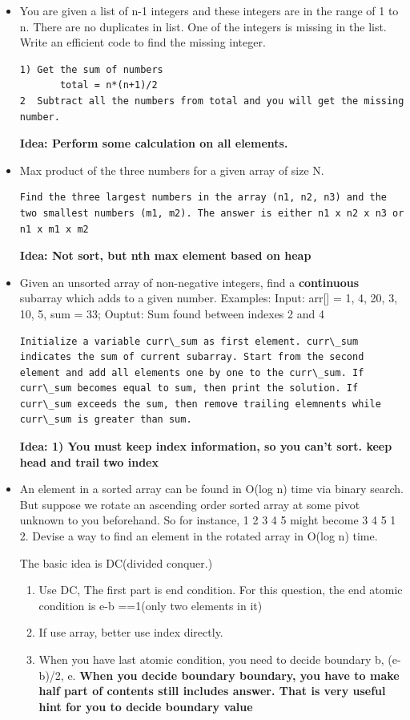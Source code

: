 \documentclass[a4paper,12pt,twoside]{book}
\begin{document}
\begin{itemize}
\item You are given a list of n-1 integers and these integers are in the range of 1 to n. There are no duplicates in list. One of the integers is missing in the list. Write an efficient code to find the missing integer.
\begin{lstlisting}[breaklines]
1) Get the sum of numbers 
       total = n*(n+1)/2
2  Subtract all the numbers from total and you will get the missing number.
\end{lstlisting}
\textbf{Idea: Perform some calculation on all elements. }

\item Max product of the three numbers for a given array of size N. 
\begin{lstlisting}[breaklines]
Find the three largest numbers in the array (n1, n2, n3) and the two smallest numbers (m1, m2). The answer is either n1 x n2 x n3 or n1 x m1 x m2
\end{lstlisting}
\textbf{Idea: Not sort, but nth max element based on heap}

\item Given an unsorted array of non-negative integers, find a \textbf{continuous} subarray which adds to a given number.  Examples: Input: arr[] = {1, 4, 20, 3, 10, 5}, sum = 33; Ouptut: Sum found between indexes 2 and 4
\begin{lstlisting}[breaklines]
Initialize a variable curr\_sum as first element. curr\_sum indicates the sum of current subarray. Start from the second element and add all elements one by one to the curr\_sum. If curr\_sum becomes equal to sum, then print the solution. If curr\_sum exceeds the sum, then remove trailing elemnents while curr\_sum is greater than sum.
\end{lstlisting}
\textbf{Idea: 1) You must keep index information, so you can't sort.  keep head and trail two index}

\item An element in a sorted array can be found in O(log n) time via binary search. But suppose we rotate an ascending order sorted array at some pivot unknown to you beforehand. So for instance, 1 2 3 4 5 might become 3 4 5 1 2. Devise a way to find an element in the rotated array in O(log n) time.

The basic idea is DC(divided conquer.) 
\begin{enumerate}
	\item Use DC, The first part is end condition. For this question, the end atomic condition is e-b ==1(only two elements in it)
	\item If use array, better use index directly.
	\item When you have last atomic condition, you need to decide boundary  b, (e-b)/2, e. \textbf{When you decide boundary boundary, you have to make half part of contents still includes answer. That is very useful hint for you to decide boundary value}
\end{enumerate}


\end{itemize}
\end{document}
